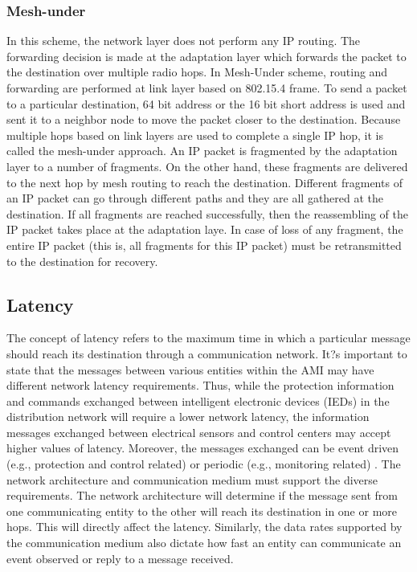 \documentclass[11pt,final,onecolumn]{IEEEtran}
\begin{document}
\subsubsection{Mesh-under}
In this scheme, the network layer does not perform any IP routing. The forwarding decision is made at the adaptation layer which forwards the packet to the destination over multiple radio hops. In Mesh-Under scheme, routing and forwarding are performed at link layer based on 802.15.4 frame. To send a packet to a particular destination, 64 bit address or the 16 bit short address is used and sent it to a neighbor node to move the packet closer to the destination. Because multiple hops based on link layers are used to complete a single IP hop, it is called the mesh-under approach. An IP packet is fragmented by the adaptation layer to a number of fragments. On the other hand, these fragments are delivered to the next hop by mesh routing to reach the destination. Different fragments of an IP packet can go through different paths and they are all gathered at the destination. If all fragments are reached successfully, then the reassembling of the IP packet takes place at the adaptation laye. In case of loss of any fragment, the entire IP packet (this is, all fragments for this IP packet) must be retransmitted to the destination for recovery.

\subsection{Latency}

The concept of latency refers to the maximum time in which a particular message should reach its destination through a communication network. It?s important to state that the messages between various entities within the AMI may have different network latency requirements. Thus, while the protection information and commands exchanged between intelligent electronic devices (IEDs) in the distribution network will require a lower network latency, the information messages exchanged between electrical sensors and control centers may accept higher values of latency.  Moreover, the messages exchanged can be event driven (e.g., protection and control related) or periodic (e.g., monitoring related) \cite{Winter2012}. The network architecture and communication medium must support the diverse requirements. The network architecture will determine if the message sent from one communicating entity to the other will reach its destination in one or more hops. This will directly affect the latency. Similarly, the data rates supported by the communication medium also dictate how fast an entity can communicate an event observed or reply to a message received.
\end{document}
